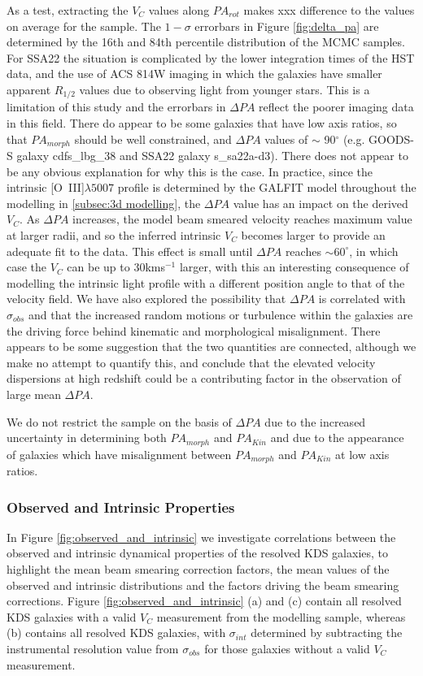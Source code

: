 \documentclass[fleqn,usenatbib]{mn2e}
\begin{document}
As a test, extracting the $V_{C}$ values along $PA_{rot}$ makes xxx difference to the values on average for the sample. 
The $1-\sigma$ errorbars in Figure \ref{fig:delta_pa} are determined by the 16th and 84th percentile distribution of the MCMC samples.
For SSA22 the situation is complicated by the lower integration times of the HST data, and the use of ACS 814W imaging in which the galaxies have smaller apparent $R_{1/2}$ values due to observing light from younger stars.
This is a limitation of this study and the errorbars in $\Delta PA$ reflect the poorer imaging data in this field.
There do appear to be some galaxies that have low axis ratios, so that $PA_{morph}$ should be well constrained, and $\Delta PA$ values of $\sim$ 90$^{\circ}$ (e.g. GOODS-S galaxy cdfs\_lbg\_38 and SSA22 galaxy s\_sa22a-d3).
There does not appear to be any obvious explanation for why this is the case.
In practice, since the intrinsic [O~{\sc III}]$\lambda5007$ profile is determined by the GALFIT model throughout the modelling in \cref{subsec:3d modelling}, the $\Delta PA$ value has an impact on the derived $V_{C}$.
As $\Delta PA$ increases, the model beam smeared velocity reaches maximum value at larger radii, and so the inferred intrinsic $V_{C}$ becomes larger to provide an adequate fit to the data.
This effect is small until $\Delta PA$ reaches $\sim 60^{\circ}$, in which case the $V_{C}$ can be up to 30kms$^{-1}$ larger, with this an interesting consequence of modelling the intrinsic light profile with a different position angle to that of the velocity field.
We have also explored the possibility that $\Delta PA$ is correlated with $\sigma_{obs}$ and that the increased random motions or turbulence within the galaxies are the driving force behind kinematic and morphological misalignment.
There appears to be some suggestion that the two quantities are connected, although we make no attempt to quantify this, and conclude that the elevated velocity dispersions at high redshift could be a contributing factor in the observation of large mean $\Delta PA$.

We do not restrict the sample on the basis of $\Delta PA$ due to the increased uncertainty in determining both $PA_{morph}$ and $PA_{Kin}$ and due to the appearance of galaxies which have misalignment between $PA_{morph}$ and $PA_{Kin}$ at low axis ratios.  

\subsubsection{Observed and Intrinsic Properties}\label{subsubsec:observed_and_intrinsic}
In Figure \ref{fig:observed_and_intrinsic} we investigate correlations between the observed and intrinsic dynamical properties of the resolved KDS galaxies, to highlight the mean beam smearing correction factors, the mean values of the observed and intrinsic distributions and the factors driving the beam smearing corrections.
Figure \ref{fig:observed_and_intrinsic} (a) and (c) contain all resolved KDS galaxies with a valid $V_{C}$ measurement from the modelling sample, whereas (b) contains all resolved KDS galaxies, with $\sigma_{int}$ determined by subtracting the instrumental resolution value from $\sigma_{obs}$ for those galaxies without a valid $V_{C}$ measurement. 
\end{document}
